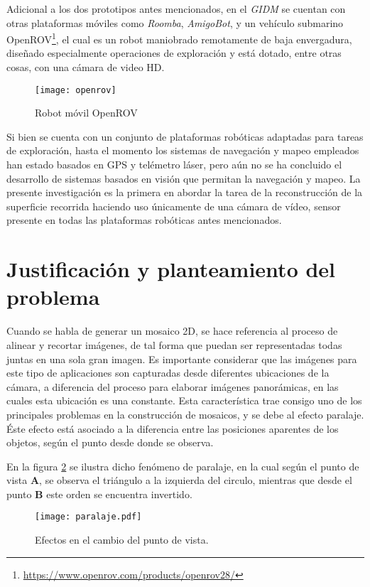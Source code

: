 Adicional a los dos prototipos antes mencionados, en el \textit{GIDM} se cuentan con otras plataformas móviles como \textit{Roomba}, \textit{AmigoBot}, y un vehículo submarino OpenROV\footnote{ \url{https://www.openrov.com/products/openrov28/}}, el cual es un robot maniobrado remotamente de baja envergadura, diseñado especialmente operaciones de exploración y está dotado, entre otras cosas, con una cámara de video HD.

\begin{figure}[H]
	\centering
	\texttt{[image: openrov]}
	\caption{Robot móvil OpenROV}
	\label{imagen:openrov}
\end{figure}

Si bien se cuenta con un conjunto de plataformas robóticas adaptadas para tareas de exploración, hasta el momento los sistemas de navegación y mapeo empleados han estado basados en GPS y telémetro láser, pero aún no se ha concluido el desarrollo de sistemas basados en visión que permitan la navegación y mapeo. La presente investigación es la primera en abordar la tarea de la reconstrucción de la superficie recorrida haciendo uso únicamente de una cámara de vídeo, sensor presente en todas las plataformas robóticas antes mencionados.

\section{Justificación y planteamiento del problema}

Cuando se habla de generar un mosaico 2D, se hace referencia al proceso de alinear y recortar imágenes, de tal forma que puedan ser representadas todas juntas en una sola gran imagen. Es importante considerar que las imágenes para este tipo de aplicaciones son capturadas desde diferentes ubicaciones de la cámara, a diferencia del proceso para elaborar imágenes panorámicas, en las cuales esta ubicación es una constante. Esta característica trae consigo uno de los principales problemas en la construcción de mosaicos, y se debe al efecto paralaje. Éste efecto está asociado a la diferencia entre las posiciones aparentes de los objetos, según el punto desde donde se observa.

En la figura \ref{imagen:paralaje} se ilustra dicho fenómeno de paralaje, en la cual según el punto de vista \textbf{A}, se observa el triángulo a la izquierda del circulo, mientras que desde el punto \textbf{B} este orden se encuentra invertido. 

\begin{figure}[H]
	\centering
	\texttt{[image: paralaje.pdf]}
	\caption[Efectos en el cambio del punto de vista]{Efectos en el cambio del punto de vista.}
	\label{imagen:paralaje}
\end{figure}

